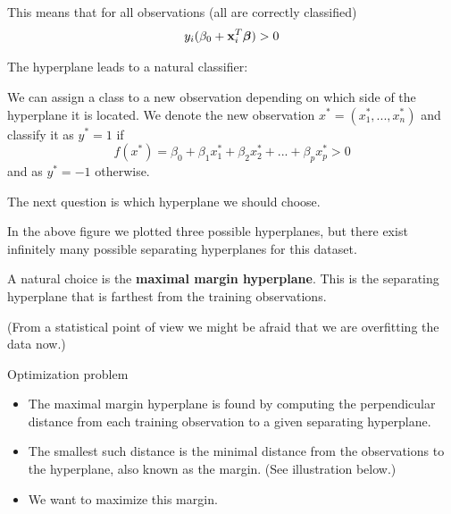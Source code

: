 \documentclass[ignorenonframetext,]{beamer}
\providecommand{\tightlist}{%
  \setlength{\itemsep}{0pt}\setlength{\parskip}{0pt}}
\begin{document}
\begin{frame}

This means that for all observations (all are correctly classified)
\[y_i (\beta_0+{\bf x}_i^T {\boldsymbol \beta})>0\]

The hyperplane leads to a natural classifier:

We can assign a class to a new observation depending on which side of
the hyperplane it is located. We denote the new observation
\(x^*=(x_1^*,...,x_n^*)\) and classify it as \(y^*=1\) if
\[f(x^*)=\beta_0+\beta_1 x_1^* + \beta_2 x_{2}^*+...+\beta_p x_{p}^*>0\]
and as \(y^*=-1\) otherwise.

\end{frame}

\begin{frame}

The next question is which hyperplane we should choose.

In the above figure we plotted three possible hyperplanes, but there
exist infinitely many possible separating hyperplanes for this dataset.

A natural choice is the \textbf{maximal margin hyperplane}. This is the
separating hyperplane that is farthest from the training observations.

(From a statistical point of view we might be afraid that we are
overfitting the data now.)

\end{frame}

\begin{frame}

\begin{block}{Optimization problem}

\begin{itemize}
\tightlist
\item
  The maximal margin hyperplane is found by computing the perpendicular
  distance from each training observation to a given separating
  hyperplane.
\item
  The smallest such distance is the minimal distance from the
  observations to the hyperplane, also known as the margin. (See
  illustration below.)
\item
  We want to maximize this margin.
\end{itemize}

\end{block}

\end{frame}
\end{document}

